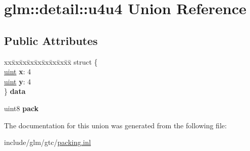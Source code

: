\hypertarget{unionglm_1_1detail_1_1u4u4}{}\section{glm\+:\+:detail\+:\+:u4u4 Union Reference}
\label{unionglm_1_1detail_1_1u4u4}
\subsection*{Public Attributes}
\begin{DoxyCompactItemize}
\item 
\mbox{\label{unionglm_1_1detail_1_1u4u4_acb55a563954be88eeb432d3b96720712}} 
\begin{tabbing}
xx\=xx\=xx\=xx\=xx\=xx\=xx\=xx\=xx\=\kill
struct \{\\
\>\hyperlink{group__core__precision_ga4fd29415871152bfb5abd588334147c8}{uint} {\bfseries x}: 4\\
\>\hyperlink{group__core__precision_ga4fd29415871152bfb5abd588334147c8}{uint} {\bfseries y}: 4\\
\} {\bfseries data}\\

\end{tabbing}\item 
\mbox{\label{unionglm_1_1detail_1_1u4u4_a823a2e3d7ae6e4710c0ceb40e191ef7b}} 
uint8 {\bfseries pack}
\end{DoxyCompactItemize}


The documentation for this union was generated from the following file\+:\begin{DoxyCompactItemize}
\item 
include/glm/gtc/\hyperlink{packing_8inl}{packing.\+inl}\end{DoxyCompactItemize}

